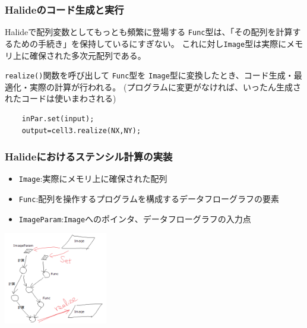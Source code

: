 \documentclass[dvipdfmx,cjk]{beamer}
\begin{document}
\begin{frame}[fragile]\frametitle{Halideのコード生成と実行}

Halideで配列変数としてもっとも頻繁に登場する
{\tt Func}型は、「その配列を計算するための手続き」を保持しているにすぎない。
これに対し{\tt Image}型は実際にメモリ上に確保された多次元配列である。

{\tt realize()}関数を呼び出して
{\tt Func}型を
{\tt Image}型に変換したとき、コード生成・最適化・実際の計算が行われる。
(プログラムに変更がなければ、いったん生成されたコードは使いまわされる)

\begingroup
    \fontsize{9pt}{10pt}\selectfont
\begin{verbatim}
    inPar.set(input);
    output=cell3.realize(NX,NY);
\end{verbatim}
\endgroup

\end{frame}

\begin{frame}[fragile]\frametitle{Halideにおけるステンシル計算の実装}
\begin{itemize}
\item {\tt Image}:実際にメモリ上に確保された配列
\item {\tt Func}:配列を操作するプログラムを構成するデータフローグラフの要素
\item {\tt ImageParam}:{\tt Image}へのポインタ、データフローグラフの入力点
\end{itemize}

\begin{center}
\includegraphics[height=4cm]{figure/DFG.png}
\end{center}
\end{frame}
\end{document}
